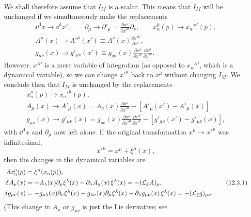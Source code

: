 We shall therefore assume that \(I_M\) is a scalar. This means that \(I_M\)
will be unchanged if we simultaneously make the replacements
\[
\begin{gathered}
  \dd^4x\longrightarrow\dd^4x',
  \qquad
  \partial_\mu
  \longrightarrow
  \partial'_\mu
  =
  \frac{\partial x^\nu}{\partial x'^\mu}\partial_\nu,
  \qquad
  x_n^\mu(p)\longrightarrow x_n'^\mu(p),
  \\
  A^\mu(x)
  \longrightarrow
  A'^\mu(x')
  \equiv
  A^\nu(x)\frac{\partial x'^\mu}{\partial x^\nu},
  \\
  g_{\mu\nu}(x)
  \longrightarrow
  g'_{\mu\nu}(x')
  \equiv
  g_{\rho\sigma}(x)
  \frac{\partial x^\rho}{\partial x'^\mu}
  \frac{\partial x^\sigma}{\partial x'^\nu}.
\end{gathered}
\]
However, \(x'^\mu\) is a mere variable of integration (as opposed to
\(x_n'^\mu\), which is a dynamical variable), so we can change \(x'^\mu\)
back to \(x^\mu\) without changing \(I_M\). We conclude then that \(I_M\) is
unchanged by the replacements
\[
\begin{gathered}
  x_n^\mu(p)\longrightarrow x_n'^\mu(p),
  \\
  A_\mu(x)
  \longrightarrow
  A'_\mu(x)
  =
  A_\nu(x)\frac{\partial x^\nu}{\partial x'^\mu}
  -\left[A'_\mu(x')-A'_\mu(x)\right],
  \\
  g_{\mu\nu}(x)
  \longrightarrow
  g'_{\mu\nu}(x)
  =
  g_{\rho\sigma}(x)
  \frac{\partial x^\rho}{\partial x'^\mu}
  \frac{\partial x^\sigma}{\partial x'^\nu}
  -\left[g'_{\mu\nu}(x')-g'_{\mu\nu}(x)\right],
\end{gathered}
\]
with \(\dd^4x\) and \(\partial_\mu\) now left alone. If the original
transformation \(x^\mu\longrightarrow x'^\mu\) was infinitesimal,
\[
  x'^\mu=x^\mu+\xi^\mu(x),
\]
then the changes in the dynamical variables are
\begin{equation}
\begin{aligned}
  \delta x_n^\mu(p)
  &=
  \xi^\mu(x_n(p)),
  \\
  \delta A_\mu(x)
  &=
  -A_\lambda(x)\partial_\mu\xi^\lambda(x)
  -\partial_\lambda A_\mu(x)\,\xi^\lambda(x)
  =
  -(\mathcal{L}_\xi A)_\mu,
  \\
  \delta g_{\mu\nu}(x)
  &=
  -g_{\mu\lambda}(x)\partial_\nu\xi^\lambda(x)
  -g_{\lambda\nu}(x)\partial_\mu\xi^\lambda(x)
  -\partial_\lambda g_{\mu\nu}(x)\,\xi^\lambda(x)
  =
  -(\mathcal{L}_\xi g)_{\mu\nu}.
\end{aligned}
  \tag{12.3.1}\label{eq:12.3.1}
\end{equation}
(This change in \(A_\mu\) or \(g_{\mu\nu}\) is just the Lie derivative; see
